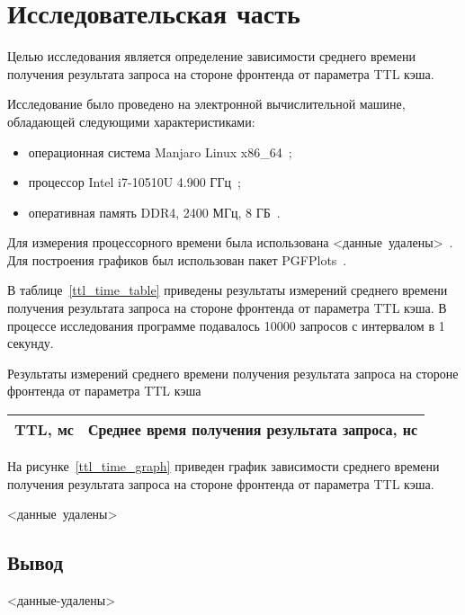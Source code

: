 \chapter{Исследовательская часть}

Целью исследования является определение зависимости среднего времени получения результата запроса на стороне фронтенда от параметра TTL кэша.

Исследование было проведено на электронной вычислительной машине, обладающей следующими характеристиками:
\begin{itemize}
	\item операционная система Manjaro Linux x86\_64~\cite{manjaro};
	\item процессор Intel i7-10510U 4.900 ГГц~\cite{cpu};
	\item оперативная память DDR4, 2400 МГц, 8 ГБ~\cite{ram}.
\end{itemize}

Для измерения процессорного времени была использована <данные~удалены>~\cite{}. Для построения графиков был использован пакет PGFPlots~\cite{pgfplots}.

В таблице~\ref{ttl_time_table} приведены результаты измерений среднего времени получения результата запроса на стороне фронтенда от параметра TTL кэша. В процессе исследования программе подавалось 10000 запросов с интервалом в 1 секунду.
\begin{center}
	\begin{threeparttable}
		\captionsetup{justification=raggedright,singlelinecheck=off}
		\caption{\label{ttl_time_table}Результаты измерений среднего времени получения результата запроса на стороне фронтенда от параметра TTL кэша}
		\centering
		\begin{tabular}{|c|c|}
			\hline
			TTL, мс & Среднее время получения результата запроса, нс \\
			\hline
		\end{tabular}
	\end{threeparttable}
\end{center}

На рисунке~\ref{ttl_time_graph} приведен график зависимости среднего времени получения результата запроса на стороне фронтенда от параметра TTL кэша.

<данные~удалены>

\section{Вывод}

<данные-удалены>

\clearpage
